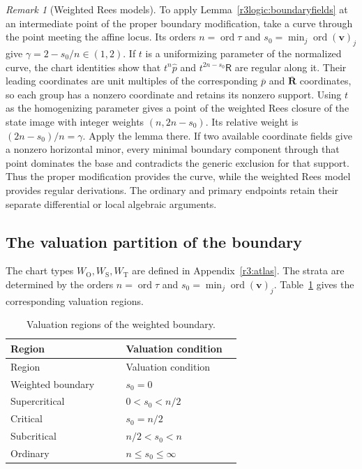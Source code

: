 \documentclass[11pt,a4paper]{article}
\numberwithin{equation}{section}
\theoremstyle{plain}
\theoremstyle{definition}
\theoremstyle{remark}
\newtheorem{remark}[theorem]{Remark}
\begin{document}
\begin{remark}[Weighted Rees models]
To apply Lemma~\ref{r3logic:boundaryfields} at an intermediate point
of the proper boundary modification, take a curve through
the point meeting the affine locus. Its orders
$n=\operatorname{ord}\tau$ and $s_0=\min_j\operatorname{ord}(\boldsymbol v)_j$ give
$\gamma=2-s_0/n\in(1,2)$. If $t$ is a uniformizing parameter of the
normalized curve, the chart identities show that
$t^n\widehat p$ and $t^{2n-s_0}\mathsf R$ are regular along it.
Their leading coordinates are unit multiples of the corresponding
$\overline p$ and $\overline{\boldsymbol R}$ coordinates, so each group
has a nonzero coordinate and retains its nonzero support.
Using $t$ as the homogenizing parameter gives a point of the weighted Rees closure of the state image with integer weights $(n,2n-s_0)$.
Its relative weight is $(2n-s_0)/n=\gamma$. Apply the lemma there.
If two available coordinate fields give a nonzero horizontal minor, every
minimal boundary component through that point dominates the base and
contradicts the generic exclusion for that support. Thus the proper
modification provides the curve, while the weighted Rees
model provides regular derivations. The ordinary and primary endpoints
retain their separate differential or local algebraic arguments.
\end{remark}

\subsection{The valuation partition of the boundary}
\label{appr3:valuationpartition}

The chart types $W_{\mathrm O},W_{\mathrm S},W_{\mathrm T}$ are defined in Appendix~\ref{r3:atlas}.
The strata are determined by the orders $n=\operatorname{ord}\tau$
and $s_0=\min_j\operatorname{ord}(\boldsymbol v)_j$.
Table~\ref{tab:r3-valuations} gives the corresponding valuation regions.

\begin{longtable}{@{}p{0.46\linewidth}p{0.46\linewidth}@{}}
\caption{Valuation regions of the weighted boundary.}\label{tab:r3-valuations}\\
\toprule Region & Valuation condition\\\midrule\endfirsthead
\toprule Region & Valuation condition\\\midrule\endhead
Weighted boundary & $s_0=0$\\
Supercritical & $0<s_0<n/2$\\
Critical & $s_0=n/2$\\
Subcritical & $n/2<s_0<n$\\
Ordinary & $n\le s_0\le\infty$\\
\bottomrule\end{longtable}
\end{document}
